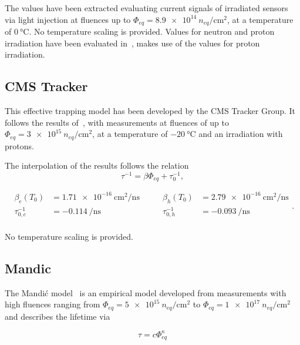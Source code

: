 The values have been extracted evaluating current signals of irradiated sensors via light injection at fluences up to $\Phi_{eq} = \SI{8.9e14}{n_{eq} \per \cm^2}$, at a temperature of $\SI{0}{\celsius}$.
No temperature scaling is provided.
Values for neutron and proton irradiation have been evaluated in~\cite{dortmundTrapping}, \apsq makes use of the values for proton irradiation.

\subsection{CMS Tracker}

This effective trapping model has been developed by the CMS Tracker Group.
It follows the results of~\cite{CMSTrackerTrapping}, with measurements at fluences of up to $\Phi_{eq} = \SI{3e15}{n_{eq} \per \cm^2}$, at a temperature of $\SI{-20}{\celsius}$ and an irradiation with protons.

The interpolation of the results follows the relation
\begin{equation*}
    \tau^{-1} = {\beta\Phi_{eq}} + \tau_0^{-1} ,
\end{equation*}

\begin{equation*}
    \begin{split}
        \beta_{e}(T_0) &= \SI{1.71e-16}{\cm^2 \per \ns} \\
        \tau_{0,e}^{-1}   &= \SI{-0.114}{\per \ns} \\
    \end{split}
    \qquad
    \begin{split}
        \beta_{h}(T_0) &= \SI{2.79e-16}{\cm^2 \per \ns} \\
        \tau_{0,h}^{-1}   &= \SI{-0.093}{\per \ns} \\
    \end{split}.
\end{equation*}

No temperature scaling is provided.

\subsection{Mandic}

The Mandi\'{c} model~\cite{Mandic} is an empirical model developed from measurements with high fluences ranging from  $\Phi_{eq} = \SI{5e15}{n_{eq} \per \cm^2}$ to  $\Phi_{eq} = \SI{1e17}{n_{eq} \per \cm^2}$ and describes the lifetime via

\begin{equation*}
    \tau = c\Phi_{eq}^{\kappa}
\end{equation*}

